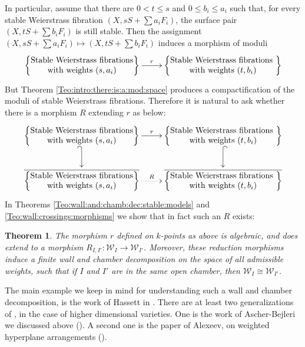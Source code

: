 \documentclass[11pt]{amsart}
\newcommand{\cE}{\mathcal{W}}
\newtheorem{Teo}[theorem]{Theorem}
\theoremstyle{definition}
\begin{document}
In particular, assume that there are $0 < t\le s$ and $0 \le b_i \le a_i$ such that, for every stable Weierstrass fibration $(X,sS+\sum a_i F_i)$, the surface pair $(X,tS+\sum b_i F_i)$ is still stable.
Then the assignment $(X,sS+\sum a_i F_i) \mapsto (X,tS+\sum b_i F_i)$ induces a morphism of moduli
$$\xymatrix{
{\left\{\begin{matrix} \text{Stable Weierstrass fibrations} \\ \text{with weights }(s,a_i)
\end{matrix} \right \}} \ar[r]^-{r} & {\left\{\begin{matrix} \text{Stable Weierstrass fibrations } \\ \text{with weights }(t,b_i)
\end{matrix} \right\}} 
}
$$
But Theorem \ref{Teo:intro:there:is:a:mod:space} produces a compactification of the moduli of stable Weierstrass fibrations. Therefore it is natural to ask whether there is a morphism $R$ extending $r$ as below: 
$$\xymatrix{
{\left\{\begin{matrix} \text{Stable Weierstrass fibrations} \\ \text{with weights }(s,a_i)
\end{matrix} \right \}} \ar[r]^-{r} \ar@{_{(}->}[d] & {\left\{\begin{matrix} \text{Stable Weierstrass fibrations } \\ \text{with weights }(t,b_i)
\end{matrix} \right\}} \ar@{^{(}->}[d]\\
\overline{{\left\{\begin{matrix} \text{Stable Weierstrass fibrations} \\ \text{with weights }(s,a_i)
\end{matrix} \right \}}} \ar@{.>}[r]^-{R} & \overline{{\left\{\begin{matrix} \text{Stable Weierstrass fibrations } \\ \text{with weights }(t,b_i)
\end{matrix} \right\}}} 
}
$$
In Theorems \ref{Teo:wall:and:chamb:dec:stable:models} and \ref{Teo:wall:crossings:morphisms} we show that in fact such an $R$ exists:
\begin{Teo}\label{Teo:intro:extension:morphism}The morphism $r$ defined on $k$-points as above is algebraic, and does extend to a morphism $R_{I,I'}:\cE_I \to \cE_{I'}$. 
Moreover, these reduction morphisms induce a finite wall and chamber decomposition on the space of all admissible weights, such that if $I$ and $I'$ are in the same open chamber, then $\cE_I \cong \cE_{I'}$.
\end{Teo}
The main example we keep in mind for understanding such a wall and chamber decomposition, is the work of Hassett in \cite{Hassett}. There are at least two generalizations of \cite{Hassett}, in the case of higher dimensional varieties. One is the work of Ascher-Bejleri we discussed above (\cite{AB3}). A second one is the paper of Alexeev, on weighted hyperplane
arrangements (\cite{Alexeevhyper}).
\end{document}
